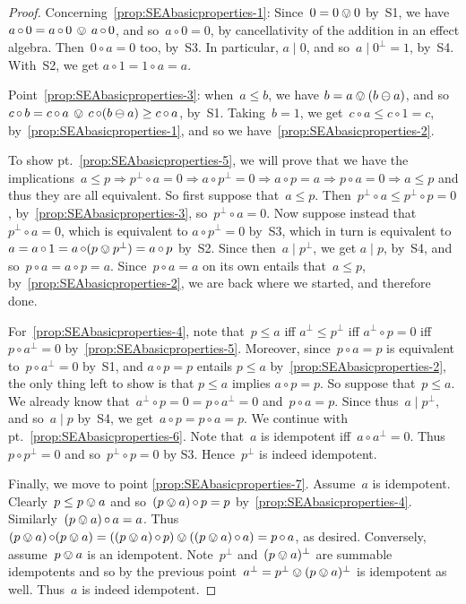 \documentclass[a4paper, onecolumn, accepted=2020-12-22]{quantumarticle}
\newcommand{\mult}{\mathop{\circ}}
\newcommand{\commu}{\mathrel{\lvert}}
\theoremstyle{definition}
\begin{document}
\begin{proof}
Concerning~\ref{prop:SEAbasicproperties-1}:
Since~$0=0\ovee 0$ by~S1,
we have $a\mult 0 = a\mult 0\,\ovee\, a\mult 0$,
and so~$a\mult 0 = 0$, by cancellativity of the addition in an effect algebra.
Then~$0\mult a=0$ too, by~S3.
In particular, $a\commu 0$, and so~$a\commu 0^\perp = 1$, by~S4.
With~S2, we get $a\mult 1 = 1\mult a = a$.

Point~\ref{prop:SEAbasicproperties-3}:
when~$a\leq b$, we have $b=a\ovee (b\ominus a)$,
    and so~$c\mult b = c\mult a\,\ovee\, c\mult(b\ominus a)
    \geq c\mult a$,
    by~S1. 
    Taking~$b=1$,
    we get~$c\mult a \leq c\mult 1 = c$,
    by~\ref{prop:SEAbasicproperties-1},
    and so we have~\ref{prop:SEAbasicproperties-2}.

To show pt.~\ref{prop:SEAbasicproperties-5},
    we will prove that we have the implications~$
    a \leq p \Rightarrow
    p^\perp \mult a = 0 \Rightarrow
    a \mult p^\perp = 0 \Rightarrow
    a \mult p = a \Rightarrow
    p \mult a = 0 \Rightarrow
    a \leq p$ and thus they are all equivalent.
    So first suppose that~$a\leq p$.
    Then~$p^\perp \mult a \leq p^\perp \mult p = 0$, 
    by~\ref{prop:SEAbasicproperties-3},
    so~$p^\perp \mult a = 0$.
Now suppose instead that $p^\perp \mult a=0$, which
is  equivalent to $a \mult p^\perp=0$ by~S3,
    which in turn is equivalent to~$a=a\mult 1 = a\mult (p\ovee p^\perp) = a\mult p$ by~S2.
Since then~$a\commu p^\perp$,
we get $a\commu p$, by~S4,
and so~$p \mult a = a\mult p = a$.
Since~$p\mult a=a$ on its own entails that~$a\leq p$,
by~\ref{prop:SEAbasicproperties-2},
we are back where we started, and therefore done.

For~\ref{prop:SEAbasicproperties-4},
note that~$p\leq a$ iff
$a^\perp \leq p^\perp$
iff $a^\perp \circ p = 0$
iff $p\circ a^\perp = 0$
by~\ref{prop:SEAbasicproperties-5}.
Moreover, since~$p\mult a=p$ is equivalent to~$p\mult a^\perp=0$ by~S1,
    and $a\mult p = p$ entails $p\leq a$ by~\ref{prop:SEAbasicproperties-2},
the only thing left to show is that $p\leq a$ implies 
    $a\mult p = p$.
So suppose that~$p\leq a$.
We already know that~$a^\perp \mult p = 0 = p \mult a^\perp = 0$
and~$p \mult a = p$.  
Since thus~$a\commu p^\perp$,
and so~$a\commu p$ by~S4,
we get~$a\mult p = p\mult a= p$.
We continue with pt.~\ref{prop:SEAbasicproperties-6}.
Note that~$a$ is idempotent iff~$a \mult a^\perp = 0$.
Thus~$p \mult p^\perp = 0$
    and so~$p^\perp \mult p = 0$ by S3.
    Hence~$p^\perp$ is indeed idempotent.

Finally, we move to point \ref{prop:SEAbasicproperties-7}.
Assume~$a$ is idempotent.
Clearly~$p \leq p \ovee a$
    and so~$(p \ovee a) \mult p = p$ by~\ref{prop:SEAbasicproperties-4}.
    Similarly~$(p \ovee a) \mult a = a$.
    Thus~$(p \ovee a) \mult (p \ovee a) = ((p \ovee a) \mult p)
    \ovee ((p \ovee a) \mult a) = p \mult a$, as desired.
Conversely, assume~$p \ovee a$ is an idempotent.
Note~$p^\perp$ and~$(p \ovee a)^\perp$ are summable idempotents and
    so by the previous point~$a^\perp = p^\perp \ovee (p \ovee a)^\perp$
    is idempotent as well. Thus~$a$ is indeed idempotent.
\end{proof}
\end{document}
